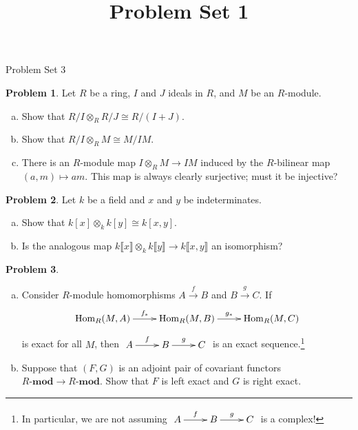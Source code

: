 \documentclass[11pt]{article}
\title{}
\date{\vspace{-0.5in}}
\title{Problem Set 1}
\DeclareMathOperator{\Hom}{Hom}
\theoremstyle{definition}
\newtheorem{problem}{Problem}
\begin{document}
\thispagestyle{fancy}
\pagestyle{fancy}


\begin{center}
	{\LARGE Problem Set 3}
\end{center}



\begin{problem}
Let $R$ be a ring, $I$ and $J$ ideals in $R$, and $M$ be an $R$-module.
\begin{enumerate}[a)]
	\item Show that $R/I \otimes_R R/J \cong R/(I+J)$.
	\item Show that $R/I \otimes_R M \cong M/IM$.
	\item There is an $R$-module map $I \otimes_R M \longrightarrow IM$ induced by the $R$-bilinear map $(a,m) \mapsto am$. This map is always clearly surjective; must it be injective?
\end{enumerate}
\end{problem}

\vfill

\begin{problem}
	Let $k$ be a field and $x$ and $y$ be indeterminates.
	\begin{enumerate}[a)]
		\item Show that $k[x] \otimes_k k[y] \cong k[x,y]$.
		\item Is the analogous map $k \llbracket x \rrbracket \otimes_k k \llbracket y \rrbracket \longrightarrow k \llbracket x,y \rrbracket$ an isomorphism?
	\end{enumerate}
\end{problem}



\vfill

\begin{problem}$\,$
	\begin{enumerate}[a)]
		\item Consider $R$-module homomorphisms $A \xrightarrow{f} B $ and $B \xrightarrow{g} C$. If
		$$\xymatrix{\Hom_R(M,A) \ar[r]^{f_*} & \Hom_R(M,B) \ar[r]^-{g_*} & \Hom_R(M,C)}$$
		is exact for all $M$, then $\xymatrix{A \ar[r]^-f & B \ar[r]^-g & C}$ is an exact sequence.\footnote{In particular, we are not assuming $\xymatrix{A \ar[r]^-f & B \ar[r]^-g & C}$ is a complex!}
		\item Suppose that $(F,G)$ is an adjoint pair of covariant functors $R\textbf{-mod} \longrightarrow R\textbf{-mod}$. Show that $F$ is left exact and $G$ is right exact.
	\end{enumerate}
\end{problem}
\end{document}
